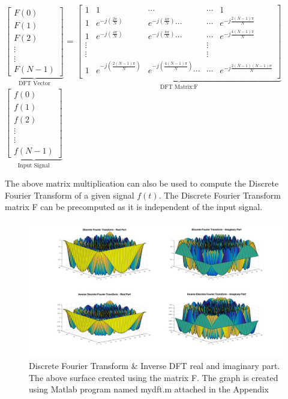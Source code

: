 $\underbrace{
\begin{bmatrix}
F(0) \\
F(1) \\
F(2) \\
\vdots \\
\vdots \\
F(N-1)
\end{bmatrix} }_{\text{DFT Vector} }$ \qquad
=
$\underbrace{
\begin{bmatrix}
1 & 1 & \cdots & \cdots & 1 \\
1 & e^{-j(\frac{2\pi}{N})} & e^{-j(\frac{4\pi}{N})}\cdots & \cdots & e^{-j\frac{2(N-1)\pi}{N}} \\
1 & e^{-j(\frac{4\pi}{N})} & e^{-j(\frac{8\pi}{N})}\cdots & \cdots &  e^{-j\frac{4(N-1)\pi}{N}} \\
\vdots & & & \vdots \\
\vdots & & & \vdots \\
1 & e^{-j(\frac{2(N-1)\pi}{N})} & e^{-j(\frac{4(N-1)\pi}{N})}\cdots & \cdots & e^{-j\frac{2(N-1)(N-1)\pi}{N}} \\
\end{bmatrix} }_{\text{DFT Matrix:F}}$
$\underbrace{
\begin{bmatrix}
f(0) \\ f(1) \\ f(2) \\ \vdots \\ \vdots \\ f(N-1) 
\end{bmatrix}}_{\text{Input Signal}}$

The above matrix multiplication can also be used to compute the Discrete Fourier Transform of a given signal $f(t)$.  The Discrete Fourier Transform matrix F can be precomputed as it is independent of the input signal. 

\begin{figure}[!ht]
\includegraphics[scale=.22]{Images/DFTRANDI}
\caption{Discrete Fourier Transform \& Inverse DFT real and imaginary part. The above surface created using the matrix F. The graph is created using Matlab program named mydft.m attached in the Appendix}
\label{fig:DFTRANDI}
\end{figure}

